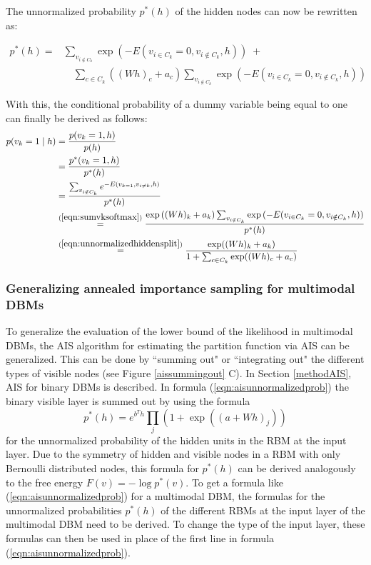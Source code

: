 \documentclass[12pt]{article}
\begin{document}
The unnormalized probability $p^*(h)$ of the hidden nodes can now be rewritten as:

\begin{align}
p^*(h) =& \sum_{v_{i \notin C_k}} \exp (-E(v_{i \in C_k} = 0, v_{i \notin C_k}, h)) \; + \nonumber \\
&\quad  \sum_{c \in C_k} \left( (Wh)_c + a_c \right) \sum_{v_{i \notin C_k}} \exp \left(-E(v_{i \in C_k} = 0, v_{i \notin C_k}, h) \right)
\label{eqn:unnormalizedhiddensplit}
\end{align}

With this, the conditional probability of a dummy variable being equal to one can finally be derived as follows:
\begin{align*}
p(v_k = 1 \mid h) &= \frac{p(v_k = 1, h)}{p(h)} \\
  &= \frac{p^*(v_k = 1, h)}{p^*(h)}\\
  &= \frac{\sum_{v_{i \notin C_k}} e^{-E(v_{k=1}, v_{i \neq k}, h)}}{p^*(h)} \\
 &\stackrel{(\ref{eqn:sumvksoftmax})}{=} \frac{\exp \left( (Wh)_k + a_k \right) \sum_{v_{i \notin C_k}} \exp \left(-E(v_{i \in C_k} = 0, v_{i \notin C_k}, h) \right)}{p^*(h)}\\
&\stackrel{(\ref{eqn:unnormalizedhiddensplit})}{=} \frac{\exp((Wh)_k + a_k)}{1 + \sum_{c \in C_k} \exp ((Wh)_c + a_c)}
\end{align*}

\subsubsection{Generalizing annealed importance sampling for multimodal DBMs} \label{unnormalizedprobsrbm}

To generalize the evaluation of the lower bound of the likelihood in multimodal DBMs, the AIS algorithm for estimating the partition function via AIS can be generalized.
This can be done by ``summing out" or ``integrating out" the different types of visible nodes (see Figure \ref{aissummingout} C).
In Section \ref{methodAIS}, AIS for binary DBMs is described.
In formula (\ref{eqn:aisunnormalizedprob}) the binary visible layer is summed out by using the formula
\[
p^*(h) = e^{b^T h} \prod_j (1+ \exp((a + W h)_j))
\]
for the unnormalized probability of the hidden units in the RBM at the input layer.
Due to the symmetry of hidden and visible nodes in a RBM with only Bernoulli distributed nodes, this formula for $p^*(h)$ can be derived analogously to the free energy $F(v) = - \log p^*(v)$.
To get a formula like (\ref{eqn:aisunnormalizedprob}) for a multimodal DBM, the formulas for the unnormalized probabilities $p^*(h)$ of the different RBMs at the input layer of the multimodal DBM need to be derived.
To change the type of the input layer, these formulas can then be used in place of the first line in formula (\ref{eqn:aisunnormalizedprob}).
\end{document}
